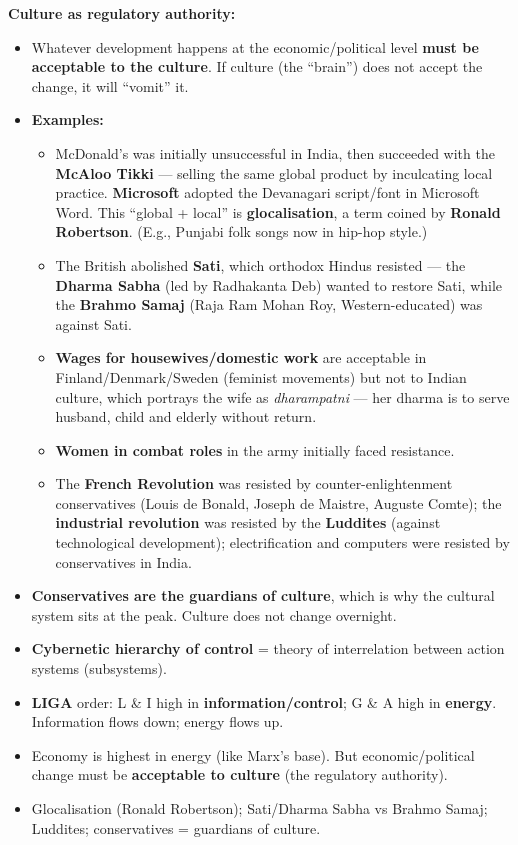 \begin{CriticalPoint}
\textbf{Culture as regulatory authority:}
\begin{itemize}
\item Whatever development happens at the economic/political level \textbf{must be acceptable to the culture}. If culture (the ``brain'') does not accept the change, it will ``vomit'' it.
\item \textbf{Examples:}
\begin{itemize}
\item McDonald's was initially unsuccessful in India, then succeeded with the \textbf{McAloo Tikki} --- selling the same global product by inculcating local practice. \textbf{Microsoft} adopted the Devanagari script/font in Microsoft Word. This ``global + local'' is \textbf{glocalisation}, a term coined by \textbf{Ronald Robertson}. (E.g., Punjabi folk songs now in hip-hop style.)
\item The British abolished \textbf{Sati}, which orthodox Hindus resisted --- the \textbf{Dharma Sabha} (led by Radhakanta Deb) wanted to restore Sati, while the \textbf{Brahmo Samaj} (Raja Ram Mohan Roy, Western-educated) was against Sati.
\item \textbf{Wages for housewives/domestic work} are acceptable in Finland/Denmark/Sweden (feminist movements) but not to Indian culture, which portrays the wife as \textit{dharampatni} --- her dharma is to serve husband, child and elderly without return.
\item \textbf{Women in combat roles} in the army initially faced resistance.
\item The \textbf{French Revolution} was resisted by counter-enlightenment conservatives (Louis de Bonald, Joseph de Maistre, Auguste Comte); the \textbf{industrial revolution} was resisted by the \textbf{Luddites} (against technological development); electrification and computers were resisted by conservatives in India.
\end{itemize}
\item \textbf{Conservatives are the guardians of culture}, which is why the cultural system sits at the peak. Culture does not change overnight.
\end{itemize}
\end{CriticalPoint}

\begin{QuickRevision}
\begin{itemize}
\item \textbf{Cybernetic hierarchy of control} = theory of interrelation between action systems (subsystems).
\item \textbf{LIGA} order: L \& I high in \textbf{information/control}; G \& A high in \textbf{energy}. Information flows down; energy flows up.
\item Economy is highest in energy (like Marx's base). But economic/political change must be \textbf{acceptable to culture} (the regulatory authority).
\item Glocalisation (Ronald Robertson); Sati/Dharma Sabha vs Brahmo Samaj; Luddites; conservatives = guardians of culture.
\end{itemize}
\end{QuickRevision}


